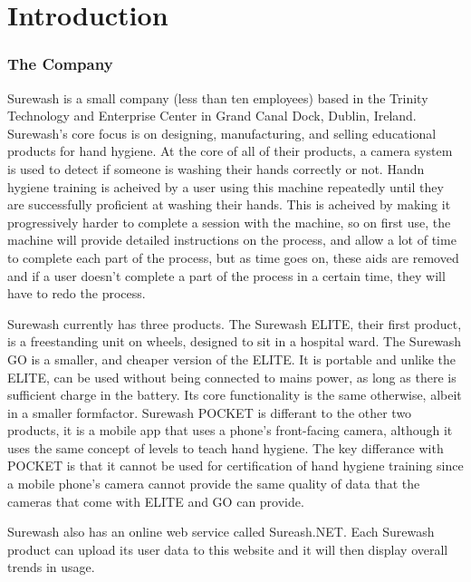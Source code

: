 \part{Introduction}
\section{The Company}
Surewash is a small company (less than ten employees) based in the Trinity Technology and Enterprise Center in Grand Canal Dock, Dublin, Ireland. Surewash's core focus is on designing, manufacturing, and selling educational products for hand hygiene. At the core of all of their products, a camera system is used to detect if someone is washing their hands correctly or not. Handn hygiene training is acheived by a user using this machine repeatedly until they are successfully proficient at washing their hands. This is acheived by making it progressively harder to complete a session with the machine, so on first use, the machine will provide detailed instructions on the process, and allow a lot of time to complete each part of the process, but as time goes on, these aids are removed and if a user doesn't complete a part of the process in a certain time, they will have to redo the process.

Surewash currently has three products. The Surewash ELITE, their first product, is a freestanding unit on wheels, designed to sit in a hospital ward. The Surewash GO is a smaller, and cheaper version of the ELITE. It is portable and unlike the ELITE, can be used without being connected to mains power, as long as there is sufficient charge in the battery. Its core functionality is the same otherwise, albeit in a smaller formfactor. Surewash POCKET is differant to the other two products, it is a mobile app that uses a phone's front-facing camera, although it uses the same concept of levels to teach hand hygiene. The key differance with POCKET is that it cannot be used for certification of hand hygiene training since a mobile phone's camera cannot provide the same quality of data that the cameras that come with ELITE and GO can provide.

Surewash also has an online web service called Sureash.NET. Each Surewash product can upload its user data to this website and it will then display overall trends in usage.

